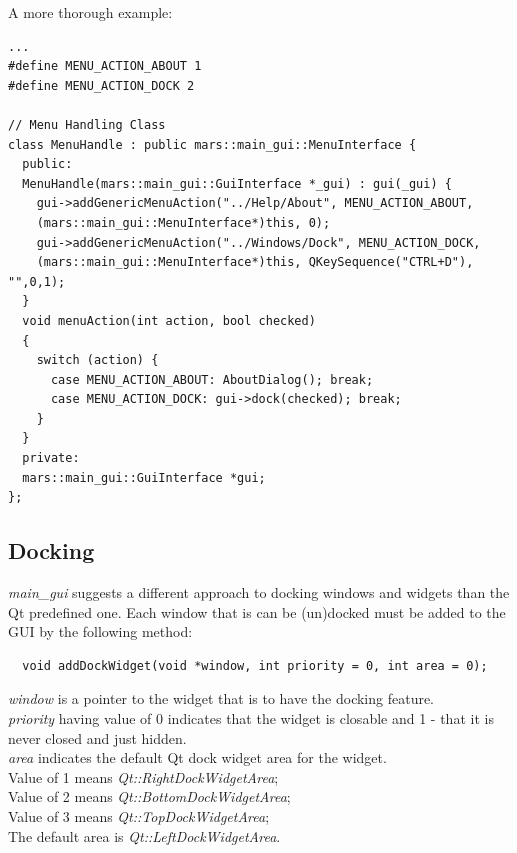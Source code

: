 \documentclass{article}
\begin{document}
A more thorough example:

\begin{lstlisting}
...
#define MENU_ACTION_ABOUT 1
#define MENU_ACTION_DOCK 2

// Menu Handling Class
class MenuHandle : public mars::main_gui::MenuInterface {
  public:
  MenuHandle(mars::main_gui::GuiInterface *_gui) : gui(_gui) {
    gui->addGenericMenuAction("../Help/About", MENU_ACTION_ABOUT,
    (mars::main_gui::MenuInterface*)this, 0);
    gui->addGenericMenuAction("../Windows/Dock", MENU_ACTION_DOCK, 
    (mars::main_gui::MenuInterface*)this, QKeySequence("CTRL+D"), "",0,1);
  }
  void menuAction(int action, bool checked)
  {
    switch (action) {
      case MENU_ACTION_ABOUT: AboutDialog(); break;
      case MENU_ACTION_DOCK: gui->dock(checked); break;
    }
  }
  private:
  mars::main_gui::GuiInterface *gui;
};

\end{lstlisting}  



\subsection{Docking}

\emph{main\_gui} suggests a different approach to docking windows and widgets than the Qt predefined one. Each window that is can be (un)docked must be added to the GUI by the following method:

\begin{lstlisting}
  void addDockWidget(void *window, int priority = 0, int area = 0);
\end{lstlisting}

\emph{window} is a pointer to the widget that is to have the docking feature.\\

\emph{priority} having value of 0 indicates that the widget is closable and 1 - that it is never closed and just hidden. \\

\emph{area} indicates the default Qt dock widget area for the widget. \\
Value of 1 means \emph{Qt::RightDockWidgetArea};\\
Value of 2 means \emph{Qt::BottomDockWidgetArea};\\ 
Value of 3 means \emph{Qt::TopDockWidgetArea};\\ 
The default area is \emph{Qt::LeftDockWidgetArea}.\\
\end{document}
